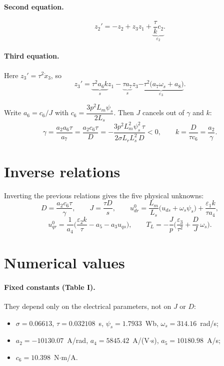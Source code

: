 \documentclass[11pt,a4paper]{article}
\begin{document}
\paragraph{Second equation.}
\[
z_2'=-z_2+z_3z_1+\underbrace{\frac{\tau}{k}c_2}_{\varepsilon_2}.
\]
\paragraph{Third equation.} Here $z_3'=\tau^2\dot x_3$, so
\[
z_3'=\underbrace{\tau^2a_6k}_{s}z_1-\underbrace{\tau a_7}_{s}z_3\underbrace{-\tau^2\big(a_7\omega_s+a_8\big)}_{\varepsilon_3}.
\]

Write $a_6=c_6/J$ with $c_6=\dfrac{3p^2L_m\psi_s}{2L_s}$. Then $J$ cancels out of $\gamma$ and $k$:
\[
\gamma=\frac{a_2a_6\tau}{a_7}=\frac{a_2c_6\tau}{D}=-\frac{3p^2L_m^2\psi_s^2\,\tau}{2\sigma L_rL_s^2\,D}<0,
\qquad k=\frac{D}{\tau c_6}=\frac{a_2}{\gamma}.
\]

\section{Inverse relations}
Inverting the previous relations gives the five physical unknowns:
\[
\boxed{D=\frac{a_2c_6\tau}{\gamma}},\qquad
\boxed{J=\frac{\tau D}{s}},\qquad
\boxed{u^0_{dr}=\frac{L_m}{L_s}\big(u_{ds}+\omega_s\psi_s\big)+\frac{\varepsilon_1k}{\tau a_4}},
\]
\[
\boxed{u^0_{qr}=\frac1{a_4}\Big(\frac{\varepsilon_2k}{\tau}-a_5-a_3u_{qs}\Big)},\qquad
\boxed{T_L=-\frac Jp\Big(\frac{\varepsilon_3}{\tau^2}+\frac DJ\,\omega_s\Big)}.
\]

\section{Numerical values}

\paragraph{Fixed constants (Table I).} They depend only on the electrical parameters, not on $J$ or $D$:
\begin{itemize}
\item $\sigma=0.06613$, $\tau=0.032108$~s, $\psi_s=1.7933$~Wb, $\omega_s=314.16$~rad/s;
\item $a_2=-10130.07$~A/rad, $a_4=5845.42$~A/(V$\cdot$s), $a_5=10180.98$~A/s;
\item $c_6=10.398$~N$\cdot$m/A.
\end{itemize}
\end{document}
